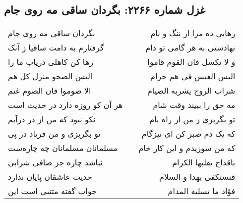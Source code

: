 \begin{center}
\section*{غزل شماره ۲۲۶۶: بگردان ساقی مه روی جام}
\label{sec:2266}
\begin{longtable}{l p{0.5cm} r}
بگردان ساقی مه روی جام
&&
رهایی ده مرا از ننگ و نام
\\
گرفتارم به دامت ساقیا ز آنک
&&
نهادستی به هر گامی تو دام
\\
رها کن کاهلی دریاب ما را
&&
و لا تکسل فان القوم قاموا
\\
الیس الصحو منزل کل هم
&&
الیس العیش فی هم حرام
\\
الا صوموا فان الصوم غنم
&&
شراب الروح یشربه الصیام
\\
هر آن کو روزه دارد در حدیث است
&&
مه حق را ببیند وقت شام
\\
نکو نبود که من از در درآیم
&&
تو بگریزی ز من از راه بام
\\
تو بگریزی و من فریاد در پی
&&
که یک دم صبر کن ای تیزگام
\\
مسلمانان مسلمانان چه چاره‌ست
&&
که من سوزیدم و این کار خام
\\
نباشد چاره جز صافی شرابی
&&
باقداح یقلبها الکرام
\\
حدیث عاشقان پایان ندارد
&&
فنستکفی بهذا و السلام
\\
جواب گفته متنبی است این
&&
فؤاد ما تسلیه المدام
\\
\end{longtable}
\end{center}

